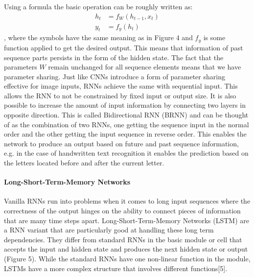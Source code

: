 \documentclass{article}
\begin{document}
Using a formula the basic operation can be roughly written as:
\[
\begin{split}
h_t &= f_W(h_{t-1}, x_t)\\
y_t &= f_y(h_t)
\end{split}
\]
, where the symbols have the same meaning as in Figure 4 and \(f_y\) is some function applied to get the desired output. This means that information of past sequence parts persists in the form of the hidden state. The fact that the parameters \(W\) remain unchanged for all sequence elements means that we have parameter sharing. Just like CNNs introduce a form of parameter sharing effective for image inputs, RNNs achieve the same with sequential input. This allows the RNN to not be constrained by fixed input or output size. It is also possible to increase the amount of input information by connecting two layers in opposite direction. This is called Bidirectional RNN (BRNN) and can be thought of as the combination of two RNNs, one getting the sequence input in the normal order and the other getting the input sequence in reverse order. This enables the network to produce an output based on future and past sequence information, e.g. in the case of handwritten text recognition it enables the prediction based on the letters located before and after the current letter.\\\\
\textbf{Long-Short-Term-Memory Networks}\\\\
Vanilla RNNs run into problems when it comes to long input sequences where the correctness of the output hinges on the ability to connect pieces of information that are many time steps apart. Long-Short-Term-Memory Networks (LSTM) are a RNN variant that are particularly good at handling these long term dependencies. They differ from standard RNNs in the basic module or cell that accepts the input and hidden state and produces the next hidden state or output (Figure 5). While the standard RNNs have one non-linear function in the module, LSTMs have a more complex structure that involves different functions[5].
\end{document}
